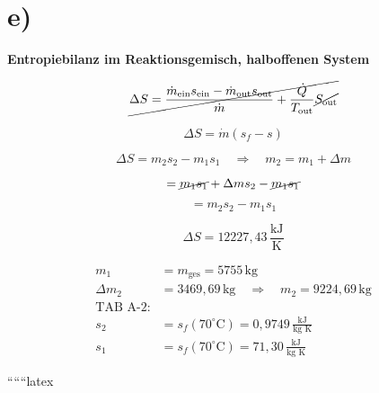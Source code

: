 

\section*{e)}

\textbf{Entropiebilanz im Reaktionsgemisch, halboffenen System}

\[
\cancel{\Delta S = \frac{\dot{m}_{\text{ein}} s_{\text{ein}} - \dot{m}_{\text{out}} s_{\text{out}}}{\dot{m}} + \frac{\dot{Q}}{T_{\text{out}}} \cancel{S_{\text{out}}}}
\]

\[
\Delta S = \dot{m} (s_f - s)
\]

\[
\Delta S = m_2 s_2 - m_1 s_1 \quad \Rightarrow \quad m_2 = m_1 + \Delta m
\]

\[
= \cancel{m_1 s_1} + \Delta m s_2 - \cancel{m_1 s_1}
\]

\[
= m_2 s_2 - m_1 s_1
\]

\[
\Delta S = 12227,43 \, \frac{\text{kJ}}{\text{K}}
\]

\[
\begin{aligned}
    m_1 &= m_{\text{ges}} = 5755 \, \text{kg} \\
    \Delta m_2 &= 3469,69 \, \text{kg} \quad \Rightarrow \quad m_2 = 9224,69 \, \text{kg} \\
    \text{TAB A-2:} \\
    s_2 &= s_f (70^\circ \text{C}) = 0,9749 \, \frac{\text{kJ}}{\text{kg K}} \\
    s_1 &= s_f (70^\circ \text{C}) = 71,30 \, \frac{\text{kJ}}{\text{kg K}}
\end{aligned}
\]

``````latex